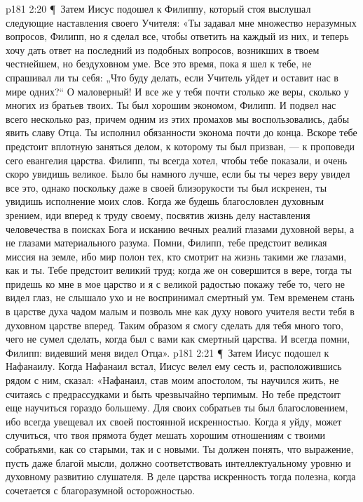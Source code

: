 \vs p181 2:20 \P\ Затем Иисус подошел к Филиппу, который стоя выслушал следующие наставления своего Учителя: «Ты задавал мне множество неразумных вопросов, Филипп, но я сделал все, чтобы ответить на каждый из них, и теперь хочу дать ответ на последний из подобных вопросов, возникших в твоем честнейшем, но бездуховном уме. Все это время, пока я шел к тебе, не спрашивал ли ты себя: „Что буду делать, если Учитель уйдет и оставит нас в мире одних?“ О маловерный! И все же у тебя почти столько же веры, сколько у многих из братьев твоих. Ты был хорошим экономом, Филипп. И подвел нас всего несколько раз, причем одним из этих промахов мы воспользовались, дабы явить славу Отца. Ты исполнил обязанности эконома почти до конца. Вскоре тебе предстоит вплотную заняться делом, к которому ты был призван, --- к проповеди сего евангелия царства. Филипп, ты всегда хотел, чтобы тебе показали, и очень скоро увидишь великое. Было бы намного лучше, если бы ты через веру увидел все это, однако поскольку даже в своей близорукости ты был искренен, ты увидишь исполнение моих слов. Когда же будешь благословлен духовным зрением, иди вперед к труду своему, посвятив жизнь делу наставления человечества в поисках Бога и исканию вечных реалий глазами духовной веры, а не глазами материального разума. Помни, Филипп, тебе предстоит великая миссия на земле, ибо мир полон тех, кто смотрит на жизнь такими же глазами, как и ты. Тебе предстоит великий труд; когда же он совершится в вере, тогда ты придешь ко мне в мое царство и я с великой радостью покажу тебе то, чего не видел глаз, не слышало ухо и не воспринимал смертный ум. Тем временем стань в царстве духа чадом малым и позволь мне как духу нового учителя вести тебя в духовном царстве вперед. Таким образом я смогу сделать для тебя много того, чего не сумел сделать, когда был с вами как смертный царства. И всегда помни, Филипп: видевший меня видел Отца».
\vs p181 2:21 \P\ Затем Иисус подошел к Нафанаилу. Когда Нафанаил встал, Иисус велел ему сесть и, расположившись рядом с ним, сказал: «Нафанаил, став моим апостолом, ты научился жить, не считаясь с предрассудками и быть чрезвычайно терпимым. Но тебе предстоит еще научиться гораздо большему. Для своих собратьев ты был благословением, ибо всегда увещевал их своей постоянной искренностью. Когда я уйду, может случиться, что твоя прямота будет мешать хорошим отношениям с твоими собратьями, как со старыми, так и с новыми. Ты должен понять, что выражение, пусть даже благой мысли, должно соответствовать интеллектуальному уровню и духовному развитию слушателя. В деле царства искренность тогда полезна, когда сочетается с благоразумной осторожностью.

